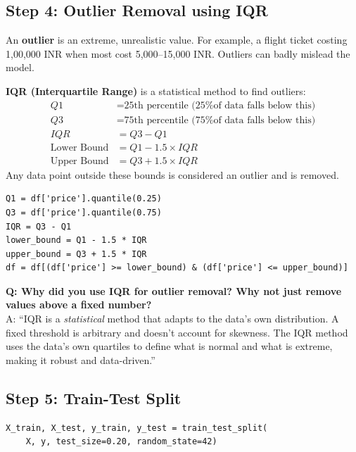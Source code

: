 \documentclass[12pt, a4paper]{article}
\begin{document}
\subsection{Step 4: Outlier Removal using IQR}

\begin{conceptbox}
    An \textbf{outlier} is an extreme, unrealistic value. For example, a flight ticket costing 1,00,000 INR when most cost 5,000--15,000 INR. Outliers can badly mislead the model.

    \vspace{0.3cm}
    \textbf{IQR (Interquartile Range)} is a statistical method to find outliers:
    \begin{align}
        Q1 &= \text{25th percentile (25\% of data falls below this)} \\
        Q3 &= \text{75th percentile (75\% of data falls below this)} \\
        IQR &= Q3 - Q1 \\
        \text{Lower Bound} &= Q1 - 1.5 \times IQR \\
        \text{Upper Bound} &= Q3 + 1.5 \times IQR
    \end{align}
    Any data point outside these bounds is considered an outlier and is removed.
\end{conceptbox}

\begin{lstlisting}
Q1 = df['price'].quantile(0.25)
Q3 = df['price'].quantile(0.75)
IQR = Q3 - Q1
lower_bound = Q1 - 1.5 * IQR
upper_bound = Q3 + 1.5 * IQR
df = df[(df['price'] >= lower_bound) & (df['price'] <= upper_bound)]
\end{lstlisting}

\begin{warnbox}
    \textbf{Q: Why did you use IQR for outlier removal? Why not just remove values above a fixed number?} \\
    A: ``IQR is a \textit{statistical} method that adapts to the data's own distribution. A fixed threshold is arbitrary and doesn't account for skewness. The IQR method uses the data's own quartiles to define what is normal and what is extreme, making it robust and data-driven.''
\end{warnbox}


\subsection{Step 5: Train-Test Split}

\begin{lstlisting}
X_train, X_test, y_train, y_test = train_test_split(
    X, y, test_size=0.20, random_state=42)
\end{lstlisting}
\end{document}
